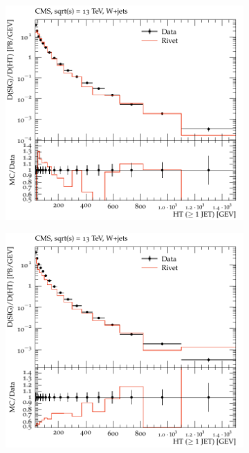 \documentclass{beamer}
\begin{document}
\begin{frame}
\begin{figure}[!h]
\begin{subfigure}[b]{0.44\textwidth}
\centering
\includegraphics[width=\textwidth]{pictures/MCTunig/HT}
\caption{\label{HTTune}}
\end{subfigure}
\begin{subfigure}[b]{0.44\textwidth}
\centering
\includegraphics[width=\textwidth]{pictures/MCTunig/HT_Nelson}
\caption{\label{HT}}
\end{subfigure}
\caption{  }
\end{figure}


\end{frame}
\end{document}
